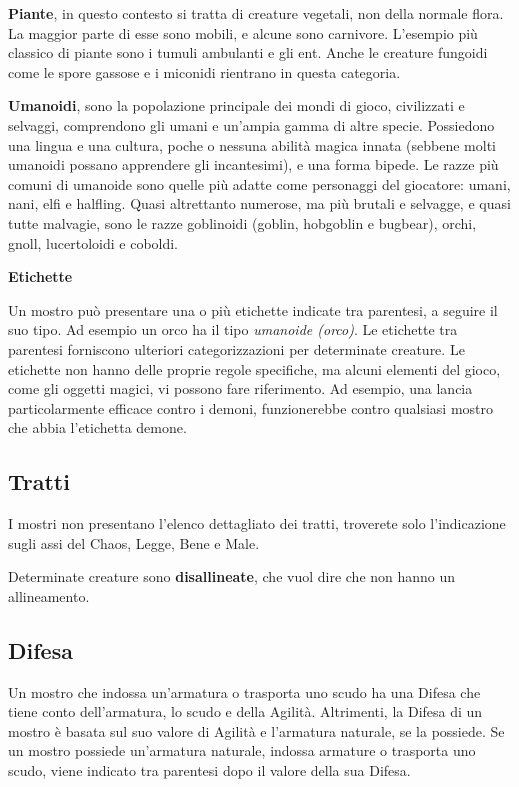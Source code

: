 \begin{multicols}{2}
\medskip\textbf{Piante}, in questo contesto si tratta di creature vegetali, non della normale flora. La maggior parte di esse sono mobili, e alcune sono carnivore. L'esempio più classico di piante sono i tumuli ambulanti e gli ent. Anche le creature fungoidi come le spore gassose e i miconidi rientrano in questa categoria.

\medskip\textbf{Umanoidi}, sono la popolazione principale dei mondi di gioco, civilizzati e selvaggi, comprendono gli umani e un'ampia gamma di altre specie. Possiedono una lingua e una cultura, poche o nessuna abilità magica innata (sebbene molti umanoidi possano apprendere gli incantesimi), e una forma bipede. Le razze più comuni di umanoide sono quelle più adatte come personaggi del giocatore: umani, nani, elfi e halfling. Quasi altrettanto numerose, ma più brutali e selvagge, e quasi tutte malvagie, sono le razze goblinoidi (goblin, hobgoblin e bugbear), orchi, gnoll, lucertoloidi e coboldi.

\medskip\textbf{Etichette}

Un mostro può presentare una o più etichette indicate tra parentesi, a seguire il suo tipo. Ad esempio un orco ha il tipo \emph{umanoide (orco)}. Le etichette tra parentesi forniscono ulteriori categorizzazioni per determinate creature. Le etichette non hanno delle proprie regole specifiche, ma alcuni elementi del gioco, come gli oggetti magici, vi possono fare riferimento. Ad esempio, una lancia particolarmente efficace contro i demoni, funzionerebbe contro qualsiasi mostro che abbia l'etichetta demone.

\subsection{Tratti}

I mostri non presentano l'elenco dettagliato dei tratti, troverete solo l'indicazione sugli assi del Chaos, Legge, Bene e Male.

Determinate creature  sono \textbf{disallineate}, che vuol dire che non hanno
un allineamento.

\subsection{Difesa}

Un mostro che indossa un'armatura o trasporta uno scudo ha una Difesa che tiene conto dell'armatura, lo scudo e della Agilità. Altrimenti, la Difesa di un mostro è basata sul suo valore di Agilità e l'armatura naturale, se la possiede. Se un mostro possiede un'armatura naturale, indossa armature o trasporta uno scudo, viene indicato tra parentesi dopo il valore della sua Difesa.


\end{multicols}
